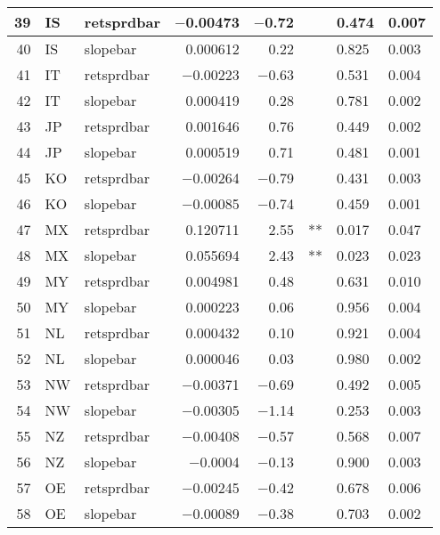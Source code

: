 \begin{longtable}{|r|l|l|r|r|l|l|l|}
   39 &    IS &    retsprdbar &    $-$0.00473 &    $-$0.72 &      &    0.474 &    0.007\\\hline
   40 &    IS &    slopebar &    0.000612 &    0.22 &      &    0.825 &    0.003\\\hline
   41 &    IT &    retsprdbar &    $-$0.00223 &    $-$0.63 &      &    0.531 &    0.004\\\hline
   42 &    IT &    slopebar &    0.000419 &    0.28 &      &    0.781 &    0.002\\\hline
   43 &    JP &    retsprdbar &    0.001646 &    0.76 &      &    0.449 &    0.002\\\hline
   44 &    JP &    slopebar &    0.000519 &    0.71 &      &    0.481 &    0.001\\\hline
   45 &    KO &    retsprdbar &    $-$0.00264 &    $-$0.79 &      &    0.431 &    0.003\\\hline
   46 &    KO &    slopebar &    $-$0.00085 &    $-$0.74 &      &    0.459 &    0.001\\\hline
   47 &    MX &    retsprdbar &    0.120711 &    2.55 &    ** &    0.017 &    0.047\\\hline
   48 &    MX &    slopebar &    0.055694 &    2.43 &    ** &    0.023 &    0.023\\\hline
   49 &    MY &    retsprdbar &    0.004981 &    0.48 &      &    0.631 &    0.010\\\hline
   50 &    MY &    slopebar &    0.000223 &    0.06 &      &    0.956 &    0.004\\\hline
   51 &    NL &    retsprdbar &    0.000432 &    0.10 &      &    0.921 &    0.004\\\hline
   52 &    NL &    slopebar &    0.000046 &    0.03 &      &    0.980 &    0.002\\\hline
   53 &    NW &    retsprdbar &    $-$0.00371 &    $-$0.69 &      &    0.492 &    0.005\\\hline
   54 &    NW &    slopebar &    $-$0.00305 &    $-$1.14 &      &    0.253 &    0.003\\\hline
   55 &    NZ &    retsprdbar &    $-$0.00408 &    $-$0.57 &      &    0.568 &    0.007\\\hline
   56 &    NZ &    slopebar &    $-$0.0004 &    $-$0.13 &      &    0.900 &    0.003\\\hline
   57 &    OE &    retsprdbar &    $-$0.00245 &    $-$0.42 &      &    0.678 &    0.006\\\hline
   58 &    OE &    slopebar &    $-$0.00089 &    $-$0.38 &      &    0.703 &    0.002\\\hline

\end{longtable}
